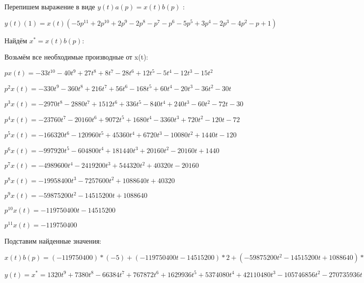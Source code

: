 \documentclass{article}
\begin{document}
{{{Перепишем выражение в виде $y(t)a(p)=x(t)b(p)$ :

$y(t)(1)=x(t)(-5p^{11}+2p^{10}+2p^{9}-2p^{8}-p^{7}-p^{6}-5p^{5}+3p^{4}-2p^{3}-4p^{2}-p+1)$

Найдём $x^*=x(t)b(p)$:

Возьмём все необходимые производные от x(t):

$px(t)=-33t^{10}-40t^{9}+27t^{8}+8t^{7}-28t^{6}+12t^{5}-5t^{4}-12t^{3}-15t^{2}$

$p^2x(t)=-330t^{9}-360t^{8}+216t^{7}+56t^{6}-168t^{5}+60t^{4}-20t^{3}-36t^{2}-30t$

$p^3x(t)=-2970t^{8}-2880t^{7}+1512t^{6}+336t^{5}-840t^{4}+240t^{3}-60t^{2}-72t-30$

$p^4x(t)=-23760t^{7}-20160t^{6}+9072t^{5}+1680t^{4}-3360t^{3}+720t^{2}-120t-72$

$p^5x(t)=-166320t^{6}-120960t^{5}+45360t^{4}+6720t^{3}-10080t^{2}+1440t-120$

$p^6x(t)=-997920t^{5}-604800t^{4}+181440t^{3}+20160t^{2}-20160t+1440$

$p^7x(t)=-4989600t^{4}-2419200t^{3}+544320t^{2}+40320t-20160$

$p^8x(t)=-19958400t^{3}-7257600t^{2}+1088640t+40320$

$p^9x(t)=-59875200t^{2}-14515200t+1088640$

$p^10x(t)=-119750400t-14515200$

$p^11x(t)=-119750400$

Подставим найденные значения:

$x(t)b(p) = (-119750400)*(-5)+(-119750400t-14515200)*2+(-59875200t^{2}-14515200t+1088640)*2+(-19958400t^{3}-7257600t^{2}+1088640t+40320)*(-2)+(-4989600t^{4}-2419200t^{3}+544320t^{2}+40320t-20160)*(-1)+(-997920t^{5}-604800t^{4}+181440t^{3}+20160t^{2}-20160t+1440)*(-1)+(-166320t^{6}-120960t^{5}+45360t^{4}+6720t^{3}-10080t^{2}+1440t-120)*(-5)+(-23760t^{7}-20160t^{6}+9072t^{5}+1680t^{4}-3360t^{3}+720t^{2}-120t-72)*3+(-2970t^{8}-2880t^{7}+1512t^{6}+336t^{5}-840t^{4}+240t^{3}-60t^{2}-72t-30)*(-2)+(-330t^{9}-360t^{8}+216t^{7}+56t^{6}-168t^{5}+60t^{4}-20t^{3}-36t^{2}-30t)*(-4)+(-33t^{10}-40t^{9}+27t^{8}+8t^{7}-28t^{6}+12t^{5}-5t^{4}-12t^{3}-15t^{2})*(-1)+(-33t^{10}-40t^{9}+27t^{8}+8t^{7}-28t^{6}+12t^{5}-5t^{4}-12t^{3}-15t^{2})*1=1320t^{9}+7380t^{8}-66384t^{7}+767872t^{6}+1629936t^{5}+5374080t^{4}+42110480t^{3}-105746856t^{2}-270735936t$





$y(t)=x^*=1320t^{9}+7380t^{8}-66384t^{7}+767872t^{6}+1629936t^{5}+5374080t^{4}+42110480t^{3}-105746856t^{2}-270735936t$

}}}
\end{document}
